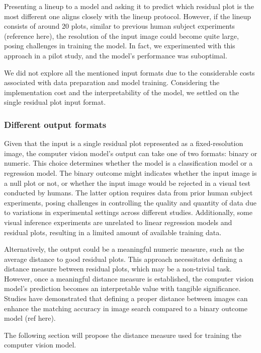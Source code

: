 \documentclass[]{interact}
\theoremstyle{plain}%
\theoremstyle{definition}
\theoremstyle{remark}
\begin{document}
Presenting a lineup to a model and asking it to predict which residual
plot is the most different one aligns closely with the lineup protocol.
However, if the lineup consists of around 20 plots, similar to previous
human subject experiments (reference here), the resolution of the input
image could become quite large, posing challenges in training the model.
In fact, we experimented with this approach in a pilot study, and the
model's performance was suboptimal.

We did not explore all the mentioned input formats due to the
considerable costs associated with data preparation and model training.
Considering the implementation cost and the interpretability of the
model, we settled on the single residual plot input format.

\hypertarget{different-output-formats}{%
\subsubsection{Different output
formats}\label{different-output-formats}}

Given that the input is a single residual plot represented as a
fixed-resolution image, the computer vision model's output can take one
of two formats: binary or numeric. This choice determines whether the
model is a classification model or a regression model. The binary
outcome might indicates whether the input image is a null plot or not,
or whether the input image would be rejected in a visual test conducted
by humans. The latter option requires data from prior human subject
experiments, posing challenges in controlling the quality and quantity
of data due to variations in experimental settings across different
studies. Additionally, some visual inference experiments are unrelated
to linear regression models and residual plots, resulting in a limited
amount of available training data.

Alternatively, the output could be a meaningful numeric measure, such as
the average distance to good residual plots. This approach necessitates
defining a distance measure between residual plots, which may be a
non-trivial task. However, once a meaningful distance measure is
established, the computer vision model's prediction becomes an
interpretable value with tangible significance. Studies have
demonstrated that defining a proper distance between images can enhance
the matching accuracy in image search compared to a binary outcome model
(ref here).

The following section will propose the distance measure used for
training the computer vision model.
\end{document}
